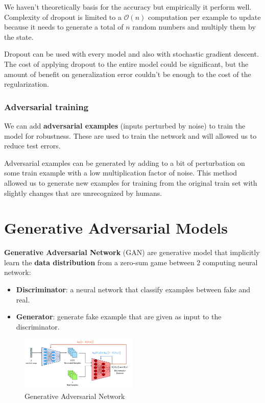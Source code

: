 We haven't theoretically basis for the accuracy but empirically it perform well.
Complexity of dropout is limited to a $\mathcal{O}(n)$ computation per example
to update because it needs to generate a total of $n$ random numbers and multiply
them by the state.

Dropout can be used with every model and also with stochastic gradient descent.
The cost of applying dropout to the entire model could be significant, but the
amount of benefit on generalization error couldn't be enough to the cost of the
regularization.
\subsubsection{Adversarial training}
We can add \textbf{adversarial examples} (inputs perturbed by noise) to train the
model for robustness. These are used to train the network and will allowed us to
reduce test errors.

Adversarial examples can be generated by adding to a bit of perturbation on some
train example with a low multiplication factor of noise. This method allowed us
to generate new examples for training from the original train set with slightly
changes that are unrecognized by humans.
\section{Generative Adversarial Models}
\textbf{Generative Adversarial Network} (GAN) are generative model that
implicitly learn the \textbf{data distribution} from a zero-sum game between 2
computing neural network:
\begin{itemize}
    \item \textbf{Discriminator}: a neural network that classify examples between
          fake and real.
    \item \textbf{Generator}: generate fake example that are given as input to the
          discriminator.
\end{itemize}

\begin{figure}[!ht]
    \centering
    \includegraphics[width=0.5\textwidth]{img/GAN.png}
    \caption{Generative Adversarial Network}
    \label{fig:gan}
\end{figure}

